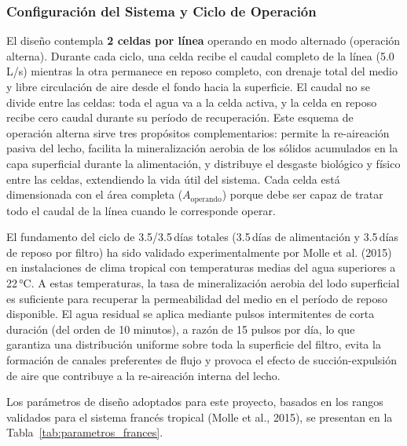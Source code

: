 \documentclass[12pt,a4paper]{article}
\begin{document}
\subsubsection*{Configuración del Sistema y Ciclo de Operación}

El diseño contempla \textbf{2 celdas por línea} operando en modo alternado (operación alterna). Durante cada ciclo, una celda recibe el caudal completo de la línea (5.0 L/s) mientras la otra permanece en reposo completo, con drenaje total del medio y libre circulación de aire desde el fondo hacia la superficie. El caudal no se divide entre las celdas: toda el agua va a la celda activa, y la celda en reposo recibe cero caudal durante su período de recuperación. Este esquema de operación alterna sirve tres propósitos complementarios: permite la re-aireación pasiva del lecho, facilita la mineralización aerobia de los sólidos acumulados en la capa superficial durante la alimentación, y distribuye el desgaste biológico y físico entre las celdas, extendiendo la vida útil del sistema. Cada celda está dimensionada con el área completa ($A_\text{operando}$) porque debe ser capaz de tratar todo el caudal de la línea cuando le corresponde operar.

El fundamento del ciclo de 3.5/3.5\,días totales (3.5\,días de alimentación y 3.5\,días de reposo por filtro) ha sido validado experimentalmente por Molle et al. (2015) en instalaciones de clima tropical con temperaturas medias del agua superiores a 22\,°C. A estas temperaturas, la tasa de mineralización aerobia del lodo superficial es suficiente para recuperar la permeabilidad del medio en el período de reposo disponible. El agua residual se aplica mediante pulsos intermitentes de corta duración (del orden de 10 minutos), a razón de 15 pulsos por día, lo que garantiza una distribución uniforme sobre toda la superficie del filtro, evita la formación de canales preferentes de flujo y provoca el efecto de succión-expulsión de aire que contribuye a la re-aireación interna del lecho.

Los parámetros de diseño adoptados para este proyecto, basados en los rangos validados para el sistema francés tropical (Molle et al., 2015), se presentan en la Tabla~\ref{tab:parametros_frances}.
\end{document}
